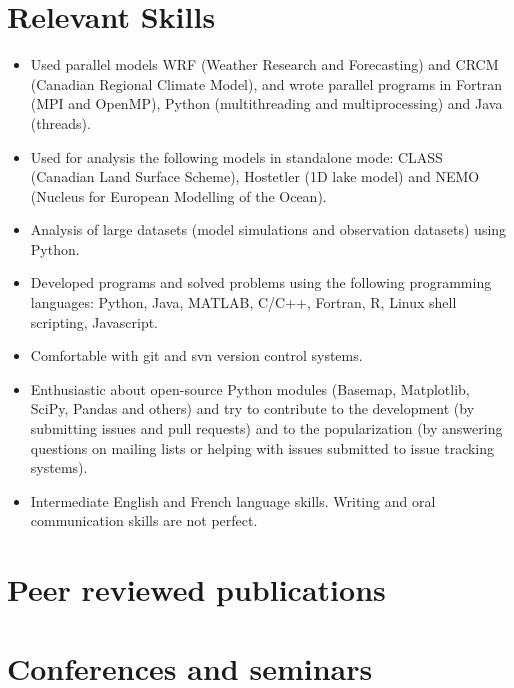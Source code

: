 \documentclass[12pt,a4paper,sans]{moderncv}
\newcommand{\vertspace}{1em}
\begin{document}
\section{Relevant Skills}
\vspace{\vertspace}
\begin{itemize}

  \item Used parallel models WRF (Weather Research and Forecasting) and CRCM
  (Canadian Regional Climate Model), and wrote parallel programs in Fortran
  (MPI and OpenMP), Python (multithreading and multiprocessing) and Java (threads).

  \item Used for analysis the following models in standalone mode: CLASS (Canadian Land Surface Scheme), Hostetler (1D lake model) and NEMO (Nucleus for European Modelling of the Ocean).

  \item Analysis of large datasets (model simulations and observation datasets) using Python.

  \item Developed programs and solved problems using the following programming languages: Python, Java, MATLAB, C/C++, Fortran, R, Linux shell scripting, Javascript.

  \item Comfortable with git and svn version control systems.

  \item Enthusiastic about open-source Python modules (Basemap, Matplotlib,
  SciPy, Pandas and others) and try to contribute to the development (by
  submitting issues and pull requests) and to the popularization (by answering
  questions on mailing lists or helping with issues submitted to
  issue tracking systems).

  \item Intermediate English and French language skills. Writing and oral communication skills are not perfect.

\end{itemize}


\section*{Peer reviewed publications}



\section*{Conferences and seminars}

\end{document}
